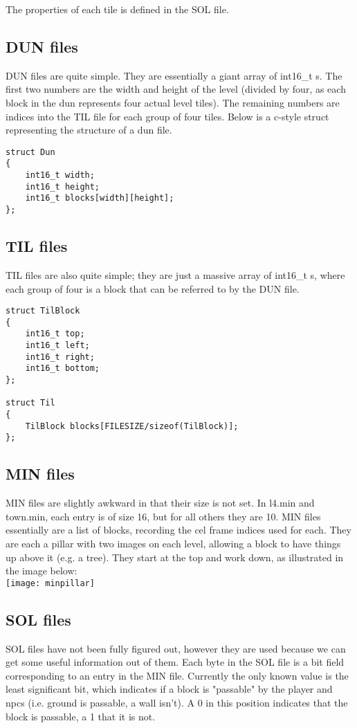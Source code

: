     The properties of each tile is defined in the SOL file.

    \subsection{DUN files}
    DUN files are quite simple. They are essentially a giant array of int16\_t s. The first two numbers are the width and height of the level (divided by four, as each block in the dun represents four actual level tiles). The remaining numbers are indices into the TIL file for each group of four tiles. Below is a c-style struct representing the structure of a dun file.
    \begin{lstlisting}
struct Dun
{
    int16_t width;
    int16_t height;
    int16_t blocks[width][height];
};
    \end{lstlisting}

    \subsection{TIL files}
    TIL files are also quite simple; they are just a massive array of int16\_t s, where each group of four is a block that can be referred to by the DUN file.

    \begin{lstlisting}
struct TilBlock
{
    int16_t top;
    int16_t left;
    int16_t right;
    int16_t bottom;
};

struct Til
{
    TilBlock blocks[FILESIZE/sizeof(TilBlock)];
};
    \end{lstlisting}

    \subsection{MIN files}
    MIN files are slightly awkward in that their size is not set. In l4.min and town.min, each entry is of size 16, but for all others they are 10.
    MIN files essentially are a list of blocks, recording the cel frame indices used for each. They are each a pillar with two images on each level, allowing a block to have things up above it (e.g. a tree). They start at the top and work down, as illustrated in the image below:\\
    \texttt{[image: minpillar]}
    
    \subsection{SOL files}
    SOL files have not been fully figured out, however they are used because we can get some useful information out of them.
    Each byte in the SOL file is a bit field corresponding to an entry in the MIN file. Currently the only known value is the least significant bit, which indicates if a block is "passable" by the player and npcs (i.e. ground is passable, a wall isn't). A 0 in this position indicates that the block is passable, a 1 that it is not.

